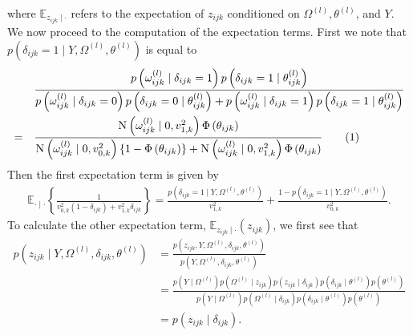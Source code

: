 \documentclass[a4paper, 11pt, oneside]{report}
\newcommand{\E}{\mathbb{E}}
\newcommand{\1}{\mathds{1}}
\newcommand{\powl}{^{(l)}}
\newcommand{\Nor}{\textsc{N}}
\begin{document}
where $\E_{z_{ijk} \mid \cdot}$ refers to the expectation of $z_{ijk}$ conditioned on
$\Omega\powl, \theta\powl$, and $Y$.
We now proceed to the computation of the expectation terms.
First we note that $p(\delta_{ijk} = 1 \mid Y, \Omega\powl, \theta\powl)$
is equal to
\begin{align*}
	       & \frac{p\left(\omega_{ijk}\powl \mid \delta_{ijk}=1\right) p\left(\delta_{ijk}=1 \mid
		\theta_{ijk}\powl\right)}{p\left(\omega_{ijk}\powl \mid \delta_{ijk}=0\right) p\left(\delta_{ijk}=0 \mid
		\theta_{ijk}\powl\right) + p\left(\omega_{ijk}\powl \mid \delta_{ijk}=1\right) p\left(\delta_{ijk}=1 \mid
	\theta_{ijk}\powl\right)}                                                                     \\
	=\quad & \frac{\Nor\left(\omega_{ijk}\powl \mid 0,
		v_{1,k}^2\right)\Phi\left(\theta_{ijk}\right)}{\Nor\left(\omega_{ijk}\powl \mid 0,
		v_{0,k}^2\right)\{1 -
		\Phi\left(\theta_{ijk}\right)\} +
		\Nor\left(\omega_{ijk}\powl \mid 0, v_{1,k}^2\right)
		\Phi\left(\theta_{ijk}\right)} \stepcounter{equation}\tag{\theequation}\label{eq:pdelta1}
\end{align*}
Then the first expectation term is given by
\begin{align*}
	\E_{\cdot \mid \cdot} \left\{ \frac{1}{v_{0,k}^2 (1 - \delta_{ijk}) + v_{1,k}^2 \delta_{ijk}} \right\}
	= \frac{p\left(\delta_{ijk} = 1 \mid Y, \Omega\powl, \theta\powl\right)}{v_{1,k}^2}
	+ \frac{1 - p\left(\delta_{ijk} = 1 \mid Y, \Omega\powl,
		\theta\powl\right)}{v_{0,k}^2}.
\end{align*}
To calculate the other expectation term, $\E_{z_{ijk} \mid \cdot}(z_{ijk})$, we
first see that
\begin{align*}
	p \left(z_{ijk} \mid Y, \Omega\powl, \delta_{ijk}, \theta\powl\right) & = \frac{p\left(z_{ijk}, Y, \Omega\powl, \delta_{ijk}, \theta\powl\right)}{p\left(Y, \Omega\powl, \delta_{ijk}, \theta\powl\right)}                                                                                                                                                                                                                 \\
	                                                                      & = \frac{p\left(Y \mid \Omega\powl\right) p\left(\Omega\powl \mid z_{ijk}\right) p\left(z_{ijk} \mid \delta_{ijk}\right) p\left(\delta_{ijk} \mid \theta\powl\right) p\left(\theta\powl\right)}{p\left(Y \mid \Omega\powl\right) p\left(\Omega\powl \mid \delta_{ijk}\right) p\left(\delta_{ijk} \mid \theta\powl\right) p\left(\theta\powl\right)} \\
	                                                                      & = p(z_{ijk} \mid \delta_{ijk}).
\end{align*}
\end{document}
